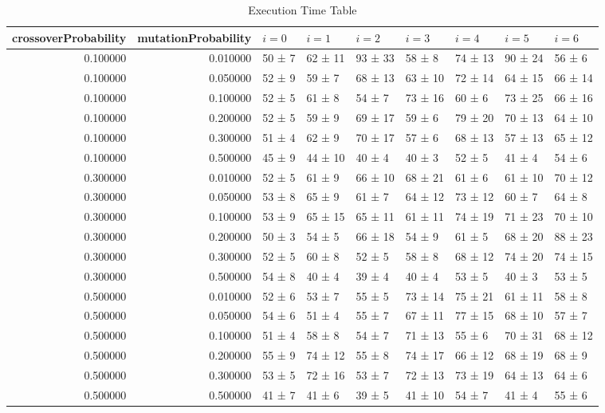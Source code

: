 \begin{table}
\caption{Execution Time Table}
\label{tab:exec_time_table}
\begin{tabular}{rrlllllll}
\toprule
crossoverProbability & mutationProbability & \(i = 0\) & \(i = 1\) & \(i = 2\) & \(i = 3\) & \(i = 4\) & \(i = 5\) & \(i = 6\) \\
\midrule
0.100000 & 0.010000 & 50 ± 7 & 62 ± 11 & 93 ± 33 & 58 ± 8 & 74 ± 13 & 90 ± 24 & 56 ± 6 \\
0.100000 & 0.050000 & 52 ± 9 & 59 ± 7 & 68 ± 13 & 63 ± 10 & 72 ± 14 & 64 ± 15 & 66 ± 14 \\
0.100000 & 0.100000 & 52 ± 5 & 61 ± 8 & 54 ± 7 & 73 ± 16 & 60 ± 6 & 73 ± 25 & 66 ± 16 \\
0.100000 & 0.200000 & 52 ± 5 & 59 ± 9 & 69 ± 17 & 59 ± 6 & 79 ± 20 & 70 ± 13 & 64 ± 10 \\
0.100000 & 0.300000 & 51 ± 4 & 62 ± 9 & 70 ± 17 & 57 ± 6 & 68 ± 13 & 57 ± 13 & 65 ± 12 \\
0.100000 & 0.500000 & 45 ± 9 & 44 ± 10 & 40 ± 4 & 40 ± 3 & 52 ± 5 & 41 ± 4 & 54 ± 6 \\
0.300000 & 0.010000 & 52 ± 5 & 61 ± 9 & 66 ± 10 & 68 ± 21 & 61 ± 6 & 61 ± 10 & 70 ± 12 \\
0.300000 & 0.050000 & 53 ± 8 & 65 ± 9 & 61 ± 7 & 64 ± 12 & 73 ± 12 & 60 ± 7 & 64 ± 8 \\
0.300000 & 0.100000 & 53 ± 9 & 65 ± 15 & 65 ± 11 & 61 ± 11 & 74 ± 19 & 71 ± 23 & 70 ± 10 \\
0.300000 & 0.200000 & 50 ± 3 & 54 ± 5 & 66 ± 18 & 54 ± 9 & 61 ± 5 & 68 ± 20 & 88 ± 23 \\
0.300000 & 0.300000 & 52 ± 5 & 60 ± 8 & 52 ± 5 & 58 ± 8 & 68 ± 12 & 74 ± 20 & 74 ± 15 \\
0.300000 & 0.500000 & 54 ± 8 & 40 ± 4 & 39 ± 4 & 40 ± 4 & 53 ± 5 & 40 ± 3 & 53 ± 5 \\
0.500000 & 0.010000 & 52 ± 6 & 53 ± 7 & 55 ± 5 & 73 ± 14 & 75 ± 21 & 61 ± 11 & 58 ± 8 \\
0.500000 & 0.050000 & 54 ± 6 & 51 ± 4 & 55 ± 7 & 67 ± 11 & 77 ± 15 & 68 ± 10 & 57 ± 7 \\
0.500000 & 0.100000 & 51 ± 4 & 58 ± 8 & 54 ± 7 & 71 ± 13 & 55 ± 6 & 70 ± 31 & 68 ± 12 \\
0.500000 & 0.200000 & 55 ± 9 & 74 ± 12 & 55 ± 8 & 74 ± 17 & 66 ± 12 & 68 ± 19 & 68 ± 9 \\
0.500000 & 0.300000 & 53 ± 5 & 72 ± 16 & 53 ± 7 & 72 ± 13 & 73 ± 19 & 64 ± 13 & 64 ± 6 \\
0.500000 & 0.500000 & 41 ± 7 & 41 ± 6 & 39 ± 5 & 41 ± 10 & 54 ± 7 & 41 ± 4 & 55 ± 6 \\

\end{tabular}
\end{table}
